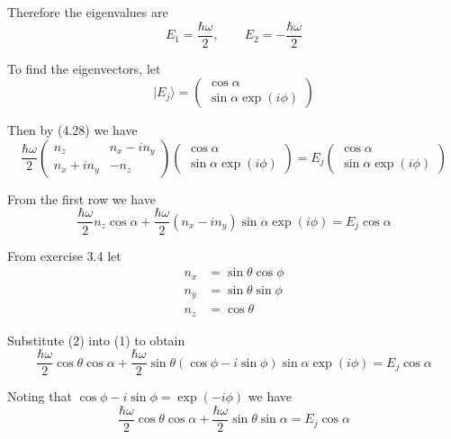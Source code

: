 \documentclass[12pt]{article}
\begin{document}
Therefore the eigenvalues are
\begin{equation*}
E_1=\frac{\hbar\omega}{2},\qquad E_2=-\frac{\hbar\omega}{2}
\end{equation*}

To find the eigenvectors, let
\begin{equation*}
|E_j\rangle=\begin{pmatrix}\cos\alpha\\\sin\alpha\exp(i\phi)\end{pmatrix}
\end{equation*}

Then by (4.28) we have
\begin{equation*}
\frac{\hbar\omega}{2}
\begin{pmatrix}
n_z & n_x-in_y
\\
n_x+in_y & -n_z
\end{pmatrix}
\begin{pmatrix}\cos\alpha\\\sin\alpha\exp(i\phi)\end{pmatrix}
=E_j\begin{pmatrix}\cos\alpha\\\sin\alpha\exp(i\phi)\end{pmatrix}
\end{equation*}

From the first row we have
\begin{equation*}
\frac{\hbar\omega}{2}n_z\cos\alpha+\frac{\hbar\omega}{2}(n_x-in_y)\sin\alpha\exp(i\phi)
=E_j\cos\alpha
\tag{1}
\end{equation*}

From exercise 3.4 let
\begin{equation*}
\begin{aligned}
n_x&=\sin\theta\cos\phi
\\
n_y&=\sin\theta\sin\phi
\\
n_z&=\cos\theta
\end{aligned}
\tag{2}
\end{equation*}

Substitute (2) into (1) to obtain
\begin{equation*}
\frac{\hbar\omega}{2}\cos\theta\cos\alpha
+\frac{\hbar\omega}{2}\sin\theta(\cos\phi-i\sin\phi)\sin\alpha\exp(i\phi)
=E_j\cos\alpha
\end{equation*}

Noting that $\cos\phi-i\sin\phi=\exp(-i\phi)$ we have
\begin{equation*}
\frac{\hbar\omega}{2}\cos\theta\cos\alpha
+\frac{\hbar\omega}{2}\sin\theta\sin\alpha
=E_j\cos\alpha
\end{equation*}
\end{document}
